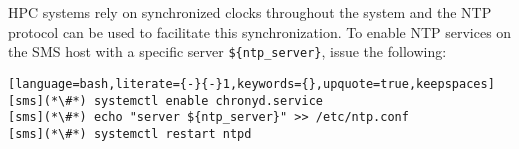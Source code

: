 HPC systems rely on synchronized clocks throughout the system and the
NTP protocol can be used to facilitate this synchronization. To enable NTP
services on the SMS host with a specific server \texttt{\$\{ntp\_server\}},
issue the following:

\begin{lstlisting}[language=bash,literate={-}{-}1,keywords={},upquote=true,keepspaces]
[sms](*\#*) systemctl enable chronyd.service
[sms](*\#*) echo "server ${ntp_server}" >> /etc/ntp.conf
[sms](*\#*) systemctl restart ntpd
\end{lstlisting}
